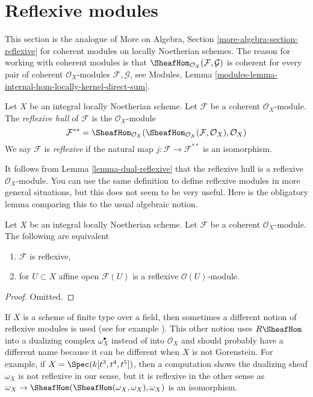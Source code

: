\section{Reflexive modules}
\label{section-reflexive}

\noindent
This section is the analogue of
More on Algebra, Section \ref{more-algebra-section-reflexive}
for coherent modules on locally Noetherian schemes. The reason for
working with coherent modules is that
$\SheafHom_{\mathcal{O}_X}(\mathcal{F}, \mathcal{G})$ is coherent
for every pair of coherent $\mathcal{O}_X$-modules $\mathcal{F}, \mathcal{G}$,
see Modules, Lemma \ref{modules-lemma-internal-hom-locally-kernel-direct-sum}.

\begin{definition}
\label{definition-reflexive}
Let $X$ be an integral locally Noetherian scheme. Let $\mathcal{F}$
be a coherent $\mathcal{O}_X$-module. The {\it reflexive hull}
of $\mathcal{F}$ is the $\mathcal{O}_X$-module
$$
\mathcal{F}^{**} = \SheafHom_{\mathcal{O}_X}(
\SheafHom_{\mathcal{O}_X}(\mathcal{F}, \mathcal{O}_X), \mathcal{O}_X)
$$
We say $\mathcal{F}$ is {\it reflexive} if the natural map
$j : \mathcal{F} \longrightarrow \mathcal{F}^{**}$
is an isomorphism.
\end{definition}

\noindent
It follows from Lemma \ref{lemma-dual-reflexive} that the reflexive hull
is a reflexive $\mathcal{O}_X$-module.
You can use the same definition to define reflexive modules in more
general situations, but this does not seem to be very useful.
Here is the obligatory lemma comparing this to the usual algebraic notion.

\begin{lemma}
\label{lemma-check-reflexive-on-affines}
Let $X$ be an integral locally Noetherian scheme. Let $\mathcal{F}$ be a
coherent $\mathcal{O}_X$-module. The following are equivalent
\begin{enumerate}
\item $\mathcal{F}$ is reflexive,
\item for $U \subset X$ affine open $\mathcal{F}(U)$
is a reflexive $\mathcal{O}(U)$-module.
\end{enumerate}
\end{lemma}

\begin{proof}
Omitted.
\end{proof}

\begin{remark}
\label{remark-different-reflexive}
If $X$ is a scheme of finite type over a field, then sometimes a different
notion of reflexive modules is used (see for example
\cite[bottom of page 5 and Definition 1.1.9]{HL}).
This other notion uses $R\SheafHom$ into a dualizing complex
$\omega_X^\bullet$ instead of into $\mathcal{O}_X$ and
should probably have a different name because it can be different
when $X$ is not Gorenstein. For example, if
$X = \Spec(k[t^3, t^4, t^5])$, then a computation shows the dualizing
sheaf $\omega_X$ is not reflexive in our sense, but it is reflexive in the
other sense as
$\omega_X \to \SheafHom(\SheafHom(\omega_X, \omega_X), \omega_X)$
is an isomorphism.
\end{remark}


